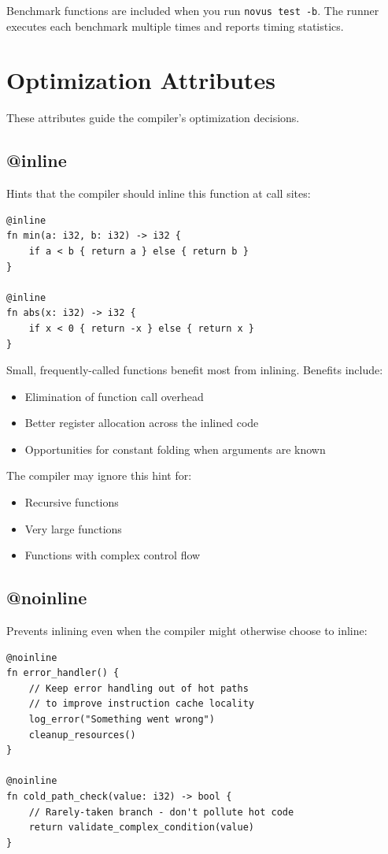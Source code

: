Benchmark functions are included when you run \texttt{novus test -b}. The runner executes each benchmark multiple times and reports timing statistics.

\section{Optimization Attributes}
\label{sec:optimization-attributes}

These attributes guide the compiler's optimization decisions.

\subsection{@inline}

Hints that the compiler should inline this function at call sites:

\begin{lstlisting}
@inline
fn min(a: i32, b: i32) -> i32 {
    if a < b { return a } else { return b }
}

@inline
fn abs(x: i32) -> i32 {
    if x < 0 { return -x } else { return x }
}
\end{lstlisting}

Small, frequently-called functions benefit most from inlining. Benefits include:
\begin{itemize}
    \item Elimination of function call overhead
    \item Better register allocation across the inlined code
    \item Opportunities for constant folding when arguments are known
\end{itemize}

The compiler may ignore this hint for:
\begin{itemize}
    \item Recursive functions
    \item Very large functions
    \item Functions with complex control flow
\end{itemize}

\subsection{@noinline}

Prevents inlining even when the compiler might otherwise choose to inline:

\begin{lstlisting}
@noinline
fn error_handler() {
    // Keep error handling out of hot paths
    // to improve instruction cache locality
    log_error("Something went wrong")
    cleanup_resources()
}

@noinline
fn cold_path_check(value: i32) -> bool {
    // Rarely-taken branch - don't pollute hot code
    return validate_complex_condition(value)
}
\end{lstlisting}

